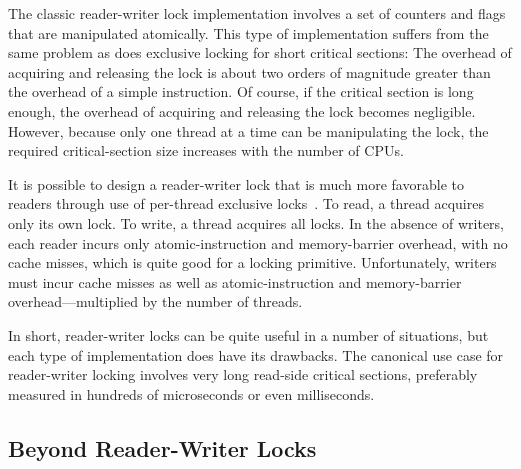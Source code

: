 The classic reader-writer lock implementation involves a set of
counters and flags that are manipulated atomically.
This type of implementation suffers from the same problem as does
exclusive locking for short critical sections: The overhead of acquiring
and releasing the lock
is about two orders of magnitude greater than the overhead
of a simple instruction.
Of course, if the critical section is long enough, the overhead of
acquiring and releasing the lock becomes negligible.
However, because only
one thread at a time can be manipulating the lock, the required
critical-section size increases with the number of CPUs.

It is possible to design a reader-writer lock that is much more
favorable to readers through use of per-thread exclusive
locks~\cite{WilsonCHsieh92a}.
To read, a thread acquires only its own lock.
To write, a thread acquires all locks.
In the absence of writers, each reader incurs only atomic-instruction
and memory-barrier overhead, with no cache misses, which is quite
good for a locking primitive.
Unfortunately, writers must incur cache misses as well as atomic-instruction
and memory-barrier overhead---multiplied by the number of threads.

In short, reader-writer locks can be quite useful in a number of
situations, but each type of implementation does have its drawbacks.
The canonical use case for reader-writer locking involves very long
read-side critical sections, preferably measured in hundreds of microseconds
or even milliseconds.

\subsection{Beyond Reader-Writer Locks}
\label{sec:locking:Beyond Reader-Writer Locks}

